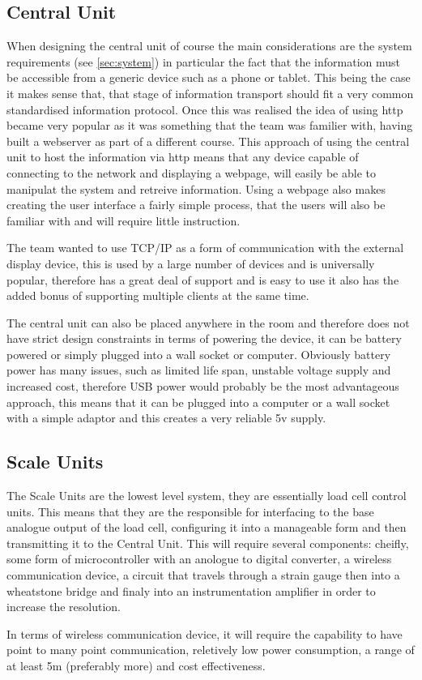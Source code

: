 \subsection{Central Unit}
\label{central_design}
When designing the central unit of course the main considerations are the system requirements (see \ref{sec:system}) in particular the fact that the information must be accessible from a generic device such as a phone or tablet. This being the case it makes sense that, that stage of information transport should fit a very common standardised information protocol. Once this was realised the idea of using http became very popular as it was something that the team was familier with, having built a webserver as part of a different course. This approach of using the central unit to host the information via http means that any device capable of connecting to the network and displaying a webpage, will easily be able to manipulat the system and retreive information. Using a webpage also makes creating the user interface a fairly simple process, that the users will also be familiar with and will require little instruction. 

The team wanted to use TCP/IP as a form of communication with the external display device, this is used by a large number of devices and is universally popular, therefore has a great deal of support and is easy to use it also has the added bonus of supporting multiple clients at the same time. 


The central unit can also be placed anywhere in the room and therefore does not have strict design constraints  in terms of powering the device, it can be battery powered or simply plugged into a wall socket or computer. Obviously battery power has many issues, such as limited life span, unstable voltage supply and increased cost, therefore USB power would probably be the most advantageous approach, this means that it can be plugged into a computer or a wall socket with a simple adaptor and this creates a very reliable 5v supply.

\subsection{Scale Units}
\label{scale_units}
The Scale Units are the lowest level system, they are essentially load cell control units. This means that they are the responsible for interfacing to the base analogue output of the load cell, configuring it into a manageable form and then transmitting it to the Central Unit. This will require several components: cheifly, some form of microcontroller with an anologue to digital converter, a wireless communication device, a circuit that travels through a strain gauge then into a wheatstone bridge and finaly into an instrumentation amplifier in order to increase the resolution. 

In terms of wireless communication device, it will require the capability to have point to many point communication, reletively low power consumption, a range of at least 5m (preferably more) and cost effectiveness.

